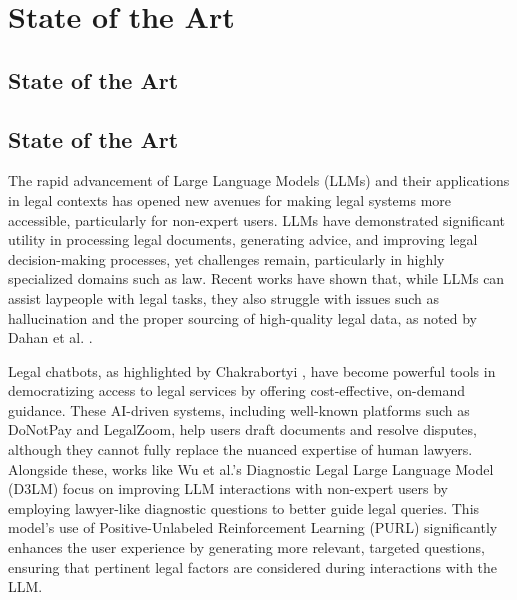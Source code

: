 \chapter{State of the Art}
\label{cha:sota}




\section{State of the Art}

\section{State of the Art}

The rapid advancement of Large Language Models (LLMs) and their applications 
in legal contexts has opened new avenues for making legal systems more accessible, 
particularly for non-expert users. LLMs have demonstrated significant utility in processing 
legal documents, generating advice, and improving legal decision-making processes, 
yet challenges remain, particularly in highly specialized domains such as law. 
Recent works have shown that, while LLMs can assist laypeople with legal tasks, 
they also struggle with issues such as hallucination and the proper sourcing of 
high-quality legal data, as noted by Dahan et al. \cite{dahan2023lawyers}.

Legal chatbots, as highlighted by Chakrabortyi \cite{chakraborty2023revolutionizing}, 
have become powerful tools in democratizing access to legal services by offering 
cost-effective, on-demand guidance. These AI-driven systems, including well-known 
platforms such as DoNotPay and LegalZoom, help users draft documents and resolve 
disputes, although they cannot fully replace the nuanced expertise of human lawyers. 
Alongside these, works like Wu et al.'s 
Diagnostic Legal Large Language Model (D3LM) \cite{wu2024knowledgeinfusedlegalwisdomnavigating} 
focus on improving LLM interactions with non-expert users by employing lawyer-like diagnostic 
questions to better guide legal queries. This model's use of Positive-Unlabeled Reinforcement 
Learning (PURL) significantly enhances the user experience by generating more relevant, 
targeted questions, ensuring that pertinent legal factors are considered during interactions with the LLM.

